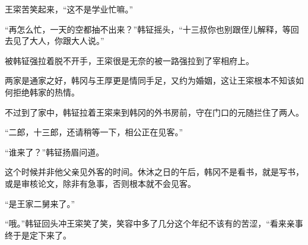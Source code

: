 王寀苦笑起来，“这不是学业忙嘛。”

“再怎么忙，一天的空都抽不出来？”韩钲摇头，“十三叔你也别跟侄儿解释，等回去见了大人，你跟大人说。”

被韩钲强拉着脱不开手，王寀很是无奈的被一路强拉到了宰相府上。

两家是通家之好，韩冈与王厚更是情同手足，又约为婚姻，这让王寀根本不知该如何拒绝韩家的热情。

不过到了家中，韩钲拉着王寀来到韩冈的外书房前，守在门口的元随拦住了两人。

“二郎，十三郎，还请稍等一下，相公正在见客。”

“谁来了？”韩钲扬眉问道。

这个时候并非他父亲见外客的时间。休沐之日的午后，韩冈不是看书，就是写书，或是审核论文，除非有急事，否则根本就不会见客。

“是王家二舅来了。”

“哦。”韩钲回头冲王寀笑了笑，笑容中多了几分这个年纪不该有的苦涩，“看来亲事终于是定下来了。
